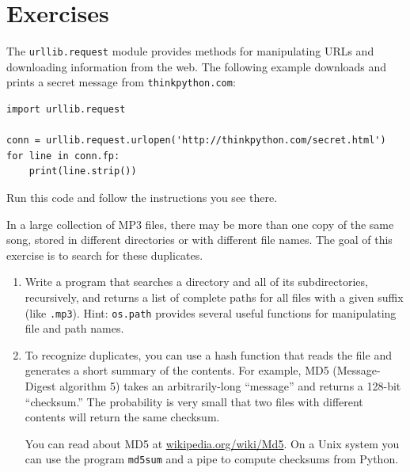 \documentclass[10pt]{book}
\begin{document}
\section{Exercises}

\begin{ex}
\label{urllib.request}


The {\tt urllib.request} module provides methods for manipulating URLs
and downloading information from the web.  The following example
downloads and prints a secret message from {\tt thinkpython.com}:

\beforeverb
\begin{verbatim}
import urllib.request

conn = urllib.request.urlopen('http://thinkpython.com/secret.html')
for line in conn.fp:
    print(line.strip())
\end{verbatim}
\afterverb

Run this code and follow the instructions you see there.


\end{ex}

\begin{ex}
\label{checksum}


In a large collection of MP3 files, there may be more than one
copy of the same song, stored in different directories or with
different file names.  The goal of this exercise is to search for
these duplicates.

\begin{enumerate}

\item Write a program that searches a directory and all of its
subdirectories, recursively, and returns a list of complete paths
for all files with a given suffix (like {\tt .mp3}).
Hint: {\tt os.path} provides several useful functions for
manipulating file and path names.


\item To recognize duplicates, you can use a hash function that
reads the file and generates a short summary
of the contents.  For example,
MD5 (Message-Digest algorithm 5) takes an arbitrarily-long
``message'' and returns a 128-bit ``checksum.''  The probability
is very small that two files with different contents will
return the same checksum.

You can read about MD5 at \url{wikipedia.org/wiki/Md5}.  On
a Unix system you can use the program {\tt md5sum} and a pipe to
compute checksums from Python.


\end{enumerate}

\end{ex}
\end{document}
